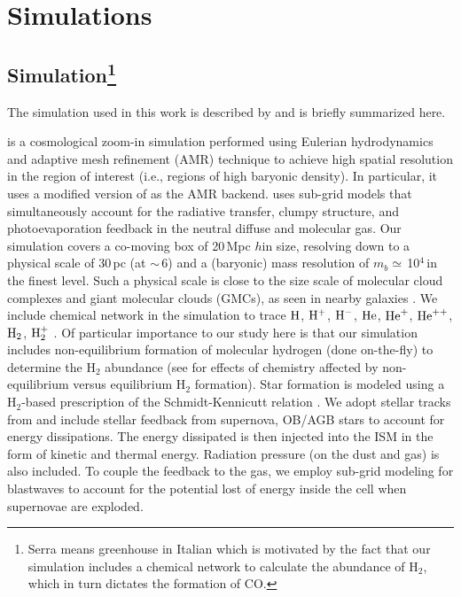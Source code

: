 \documentclass[apj]{emulateapj} %
\begin{document}
\section{Simulations} \label{sec:sim}

\subsection{ Simulation\footnote{Serra means greenhouse in Italian which is motivated by the
fact that our simulation includes a chemical network to calculate the abundance of H$_2$, which in turn 
dictates the formation of CO.
}}  
The simulation used in this work is described by \citealt{Pallottini17a} and is briefly summarized here.

 is a cosmological zoom-in simulation performed using Eulerian hydrodynamics and 
adaptive mesh refinement (AMR) technique to achieve high spatial resolution in the region of interest (i.e., regions of high baryonic density).
In particular, it uses a modified version of  as the AMR backend.
 uses sub-grid models that simultaneously account for the radiative transfer, clumpy structure, and 
photoevaporation feedback in the neutral diffuse and molecular gas. 
Our simulation covers a co-moving box of 20\,Mpc $h$\pmOne in size, resolving 
down to a physical scale of 30\,pc (at \z$\sim$\,6) and a (baryonic) mass resolution of $m_b\simeq$\,10$^4$\,\Msun in the 
finest level.
Such a physical scale is close to the size scale of molecular cloud complexes and
giant molecular clouds (GMCs), as seen in nearby galaxies \citep[e.g.,][]{Sanders85a, Federrath13a, Goodman14a}.
We include chemical network in the simulation to trace 
$\rm{H}$, $\rm{H}^{+}$, $\rm{H}^{-}$, $\rm{He}$, $\rm{He}^{+}$, $\rm{He}^{++}$, $\rm{H}_2$, $\rm{H}_2^{+}$ \citep{Grassi14a,Bovino16a}.
Of particular importance to our study here is that 
our simulation includes non-equilibrium formation of molecular 
hydrogen (done on-the-fly) to determine the H$_2$ abundance (see \citealt{Pallottini17b} for effects of 
chemistry affected by non-equilibrium versus equilibrium H$_2$ formation). 
Star formation is modeled using a H$_2$-based prescription of the Schmidt-Kennicutt relation \citep{Krumholz09a}.
We adopt stellar tracks from  and 
include stellar feedback from supernova, OB/AGB stars to account for energy dissipations.
The energy dissipated is then injected into the ISM in the form of kinetic and thermal energy.
Radiation pressure (on the dust and gas) is also included.  %
To couple the feedback to the gas, we 
employ sub-grid modeling for blastwaves to account for the potential lost of energy inside the cell when
supernovae are exploded.
\end{document}
